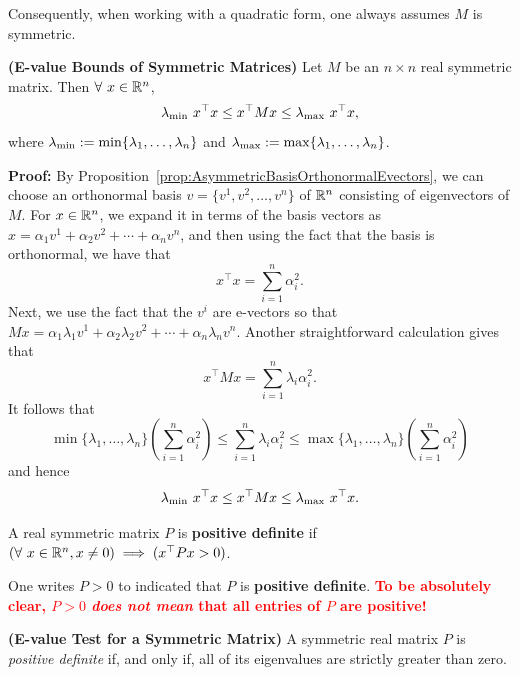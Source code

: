 \begin{rem}
Consequently, when working with a quadratic form, one always assumes $M$ is symmetric.
\end{rem}

\begin{prop} 
\label{prop:EvalueBoundsSymmetricMatrix}
\textbf{(E-value Bounds of Symmetric Matrices)}
Let $M$ be an $n \times n$ real symmetric matrix. Then $\forall~x \in \mathbb R^n$,
$$ \lambda_{\rm min}~ x^\top x \le x^\top M x \le \lambda_{\rm max} ~x^\top x,$$
where $\lambda_{\rm min}:=\min \{ \lambda_1, \ldots, \lambda_n\}$ and  $\lambda_{\rm max} :=\max \{ \lambda_1, \ldots, \lambda_n\}$.
\end{prop}

\textbf{Proof:} By Proposition~\ref{prop:AsymmetricBasisOrthonormalEvectors}, we can choose an orthonormal basis $v=\{ v^1, v^2, \ldots, v^n\}$ of $\mathbb R^n$ consisting of eigenvectors of $M$. For $x \in \mathbb R^n$, we expand it in terms of the basis vectors as 
$ x = \alpha_1 v^1 + \alpha_2 v^2 + \cdots + \alpha_n v^n$, and then using the fact that the basis is orthonormal, we have that $$x^\top x = \sum\limits_{i=1}^n \alpha_i^2.$$
Next, we use the fact that the $v^i$ are e-vectors so that $M x =  \alpha_1 \lambda_1 v^1 + \alpha_2 \lambda_2 v^2 + \cdots + \alpha_n \lambda_n v^n$. Another straightforward calculation gives that 
$$ x^\top M x = \sum\limits_{i=1}^n \lambda_i \alpha_i^2.$$
It follows that 
$$\min \{ \lambda_1, \ldots, \lambda_n\} \left( \sum\limits_{i=1}^n\alpha_i^2 \right)\le  \sum\limits_{i=1}^n \lambda_i \alpha_i^2 \le \max \{ \lambda_1, \ldots, \lambda_n\} \left(\sum\limits_{i=1}^n  \alpha_i^2 \right)$$
and hence
$$ \lambda_{\rm min}~ x^\top x \le x^\top M x \le \lambda_{\rm max} ~x^\top x.$$
\Qed

\begin{definition}
  A real symmetric matrix $P$ is \textbf{positive definite} if $(\forall ~ x \in \mathbb R^n, x\neq 0) \implies (x^\top Px>0)$.
\end{definition}


\begin{notation}
One writes $P>0$ to indicated that $P$ is \textbf{positive definite}. \textcolor{red}{\bf To be absolutely clear, $P>0$ \emph{does not mean} that all entries of $P$ are positive!}
\end{notation}

\begin{thm}
\label{thm:PosDefViaEvalues}
\textbf{(E-value Test for a Symmetric Matrix)}
A symmetric real matrix $P$ is \emph{positive definite} if, and only if, all of its eigenvalues are strictly greater than zero.
\end{thm}

